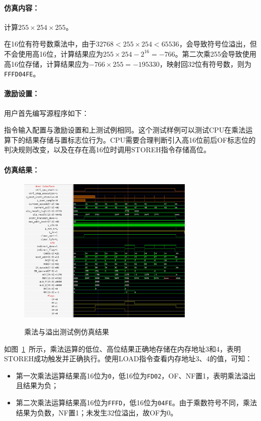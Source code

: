 \documentclass[lang=cn,a4paper,newtx]{elegantpaper}
\begin{document}
\paragraph{仿真内容：}

计算$255\times254\times255$。

在16位有符号数乘法中，由于$32768 < 255\times254 < 65536$，会导致符号位溢出，但不会使用高16位，计算结果应为$255 \times 254 -2 ^{16}= -766$。第二次乘255会导致使用高16位存储，计算结果应为$-766 \times 255 = -195330$，映射回32位有符号数，则为\texttt{FFFD04FE}。 


\paragraph{激励设置：}

用户首先编写源程序如下：


指令输入配置与激励设置和上测试例相同。这个测试样例可以测试CPU在乘法运算下的结果存储与置标志位行为。CPU需要合理判断引入高16位前后OF标志位的判决规则改变，以及在存在高16位时调用STOREH指令存储高位。

\paragraph{仿真结果：}
\begin{figure}[htbp]
  \centering
  \caption{乘法与溢出测试例仿真结果}
  \includegraphics[width = 0.75\textwidth]{figure/cpu_sim_mul.png}
  \label{fig:sim:2}
\end{figure}

如图~\ref{fig:sim:2}~所示，乘法运算的低位、高位结果正确地存储在内存地址3和4，表明STOREH成功触发并正确执行。使用LOAD指令查看内存地址3、4的值，可知：
\begin{itemize}
  \item 第一次乘法运算结果高16位为\texttt{0}，低16位为\texttt{FD02}，OF、NF置1，表明乘法溢出且结果为负；
  \item 第二次乘法运算结果高16位为\texttt{FFFD}，低16位为\texttt{04FE}。由于乘数符号不同，乘法结果为负数，NF置1；未发生32位溢出，故OF为0。
\end{itemize}
\end{document}
